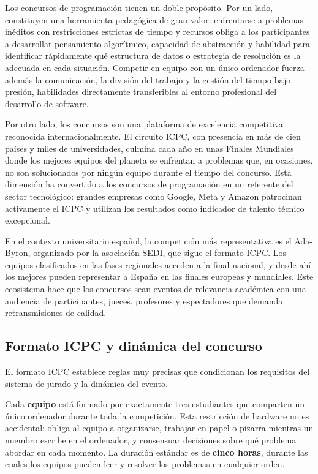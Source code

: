 Los concursos de programación tienen un doble propósito. Por un lado, constituyen una herramienta pedagógica de gran valor: enfrentarse a problemas inéditos con restricciones estrictas de tiempo y recursos obliga a los participantes a desarrollar pensamiento algorítmico, capacidad de abstracción y habilidad para identificar rápidamente qué estructura de datos o estrategia de resolución es la adecuada en cada situación. Competir en equipo con un único ordenador fuerza además la comunicación, la división del trabajo y la gestión del tiempo bajo presión, habilidades directamente transferibles al entorno profesional del desarrollo de software.

Por otro lado, los concursos son una plataforma de excelencia competitiva reconocida internacionalmente. El circuito ICPC, con presencia en más de cien países y miles de universidades, culmina cada año en unas Finales Mundiales donde los mejores equipos del planeta se enfrentan a problemas que, en ocasiones, no son solucionados por ningún equipo durante el tiempo del concurso. Esta dimensión ha convertido a los concursos de programación en un referente del sector tecnológico: grandes empresas como Google, Meta y Amazon patrocinan activamente el ICPC y utilizan los resultados como indicador de talento técnico excepcional.

En el contexto universitario español, la competición más representativa es el Ada-Byron, organizado por la asociación SEDI, que sigue el formato ICPC. Los equipos clasificados en las fases regionales acceden a la final nacional, y desde ahí los mejores pueden representar a España en las finales europeas y mundiales. Este ecosistema hace que los concursos sean eventos de relevancia académica con una audiencia de participantes, jueces, profesores y espectadores que demanda retransmisiones de calidad.

\subsection{Formato ICPC y dinámica del concurso}

El formato ICPC establece reglas muy precisas que condicionan los requisitos del sistema de jurado y la dinámica del evento.

Cada \textbf{equipo} está formado por exactamente tres estudiantes que comparten un único ordenador durante toda la competición. Esta restricción de hardware no es accidental: obliga al equipo a organizarse, trabajar en papel o pizarra mientras un miembro escribe en el ordenador, y consensuar decisiones sobre qué problema abordar en cada momento. La duración estándar es de \textbf{cinco horas}, durante las cuales los equipos pueden leer y resolver los problemas en cualquier orden.

